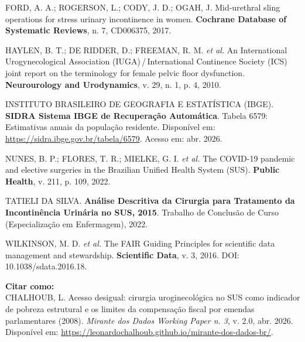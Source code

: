 \documentclass[12pt,a4paper,oneside]{article}
\begin{document}
\begin{singlespace}
\noindent\hangindent=1.25cm
FORD, A. A.; ROGERSON, L.; CODY, J. D.; OGAH, J. Mid-urethral
sling operations for stress urinary incontinence in women.
\textbf{Cochrane Database of Systematic Reviews}, n. 7,
CD006375, 2017.\par\smallskip

\noindent\hangindent=1.25cm
HAYLEN, B. T.; DE RIDDER, D.; FREEMAN, R. M. \textit{et al.}
An International Urogynecological Association
(IUGA)\,/\,International Continence Society (ICS) joint report
on the terminology for female pelvic floor dysfunction.
\textbf{Neurourology and Urodynamics}, v. 29, n. 1,
p. 4, 2010.\par\smallskip

\noindent\hangindent=1.25cm
INSTITUTO BRASILEIRO DE GEOGRAFIA E ESTATÍSTICA (IBGE).
\textbf{SIDRA \textemdash{} Sistema IBGE de Recuperação Automática}.
Tabela 6579: Estimativas anuais da população residente.
Disponível em: \url{https://sidra.ibge.gov.br/tabela/6579}.
Acesso em: abr. 2026.\par\smallskip

\noindent\hangindent=1.25cm
NUNES, B. P.; FLORES, T. R.; MIELKE, G. I. \textit{et al.} The
COVID-19 pandemic and elective surgeries in the Brazilian
Unified Health System (SUS). \textbf{Public Health}, v. 211,
p. 109, 2022.\par\smallskip

\noindent\hangindent=1.25cm
TATIELI DA SILVA. \textbf{Análise Descritiva da Cirurgia para
Tratamento da Incontinência Urinária no SUS, 2015}.
Trabalho de Conclusão de Curso (Especialização em Enfermagem),
2022.\par\smallskip

\noindent\hangindent=1.25cm
WILKINSON, M. D. \textit{et al.} The FAIR Guiding Principles
for scientific data management and stewardship.
\textbf{Scientific Data}, v. 3, 2016.
DOI: 10.1038/sdata.2016.18.\par\smallskip
\end{singlespace}

\vspace{1cm}

\noindent\textbf{Citar como:}\\
CHALHOUB, L. Acesso desigual: cirurgia uroginecológica no SUS
como indicador de pobreza estrutural e os limites da
compensação fiscal por emendas parlamentares
(2008). \textit{Mirante dos Dados \textemdash{}
Working Paper n. 3}, v. 2.0, abr. 2026. Disponível em:
\url{https://leonardochalhoub.github.io/mirante-dos-dados-br/}.
\end{document}
